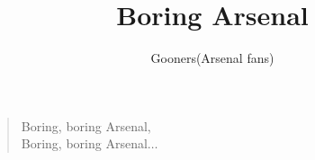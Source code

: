 \documentclass[a4paper,12pt]{article}
\title{Boring Arsenal}
\author{Gooners(Arsenal fans)}
\date{}
\begin{document}
	
	\maketitle
	
	\begin{verse}
		
		Boring, boring Arsenal, \\
		Boring, boring Arsenal$\ldots$
		
	\end{verse}
	
\end{document}
